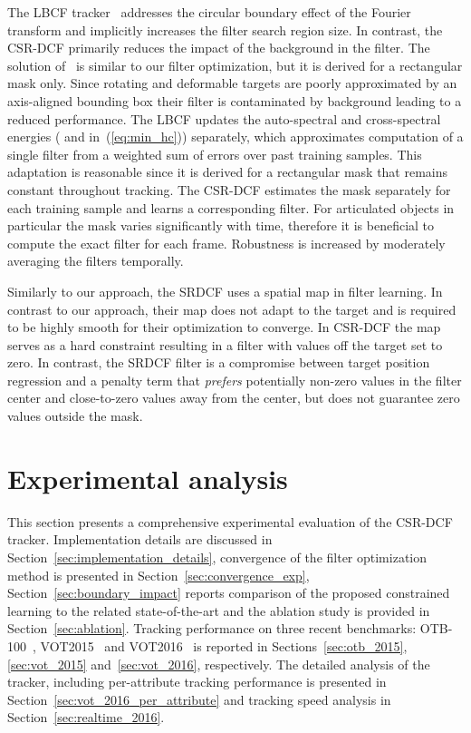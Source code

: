 \documentclass[twocolumn]{article}
\begin{document}
The LBCF tracker~\citep{cfwlb_cvpr2015} addresses the circular boundary effect of the Fourier transform and implicitly increases the filter search region size. In contrast, the CSR-DCF primarily reduces the impact of the background in the filter. The solution of~\cite{cfwlb_cvpr2015} is similar to our filter optimization, but it is derived for a rectangular mask only. Since rotating and deformable targets are poorly approximated by an axis-aligned bounding box their filter is contaminated by background leading to a reduced performance. The LBCF updates the auto-spectral and cross-spectral energies ( and  in~(\ref{eq:min_hc})) separately, which approximates computation of a single filter from a weighted sum of errors over past training samples. This adaptation is reasonable since it is derived for a rectangular mask that remains constant throughout tracking. The CSR-DCF estimates the mask separately for each training sample and learns a corresponding filter. For articulated objects in particular the mask varies significantly with time, therefore it is beneficial to compute the exact filter for each frame. Robustness is increased by moderately averaging the filters temporally.

Similarly to our approach, the SRDCF \citep{srdcf_iccv2015} uses a spatial map in filter learning. In contrast to our approach, their map does not adapt to the target and is required to be highly smooth for their optimization to converge. In CSR-DCF the map serves as a hard constraint resulting in a filter with values off the target set to zero. In contrast, the SRDCF \citep{srdcf_iccv2015} filter is a compromise between target position regression and a penalty term that {\it prefers} potentially non-zero values in the filter center and close-to-zero values away from the center, but does not guarantee zero values outside the mask.

\section{Experimental analysis}  \label{sec:experimental_analysis}

This section presents a comprehensive experimental evaluation of the  CSR-DCF tracker. Implementation details are discussed in Section~\ref{sec:implementation_details}, convergence of the filter optimization method is presented in Section~\ref{sec:convergence_exp}, Section~\ref{sec:boundary_impact} reports comparison of the proposed constrained learning to the related state-of-the-art and the ablation study is provided in Section~\ref{sec:ablation}. Tracking performance on three recent benchmarks: OTB-100~\citep{otb_pami2015}, VOT2015~\citep{kristan_vot2015} and VOT2016~\citep{kristan_vot2016} is reported in Sections~\ref{sec:otb_2015}, \ref{sec:vot_2015} and~\ref{sec:vot_2016}, respectively. The detailed analysis of the tracker, including per-attribute tracking performance is presented in Section~\ref{sec:vot_2016_per_attribute} and tracking speed analysis in Section~\ref{sec:realtime_2016}.
 
\end{document}
